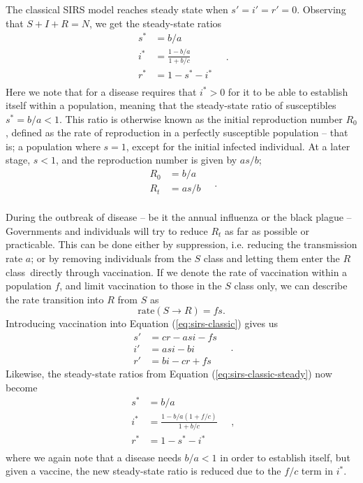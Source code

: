 \documentclass[]{article}
\begin{document}
The classical SIRS model reaches steady state when $s'=i'=r'=0$. Observing that $S + I + R = N$, we get the steady-state ratios
\begin{equation} \label{eq:sirs-classic-steady}
\begin{aligned}
	s^* &= b/a \\
	i^* &= \frac{1 - b/a}{1 + b/c} \\
	r^* &= 1 - s^* - i^* \\
\end{aligned} \quad .
\end{equation}
Here we note that for a disease requires that $i^* > 0$ for it to be able to establish itself within a population, meaning that the steady-state ratio of susceptibles $s^* = b/a < 1$. This ratio is otherwise known as the initial reproduction number $R_0$, defined as the rate of reproduction in a perfectly susceptible population -- that is; a population where $s = 1$, except for the initial infected individual. At a later stage, $s < 1$, and the reproduction number is given by $as/b$;
\begin{equation}
\begin{aligned}
	R_0 &= b/a \\
	R_t &= as/b \\
\end{aligned} \quad .
\end{equation}

During the outbreak of disease -- be it the annual influenza or the black plague -- Governments and individuals will try to reduce $R_t$ as far as possible or practicable. This can be done either by suppression, i.e. reducing the transmission rate $a$; or by removing individuals from the $S$ class and letting them enter the $R$ class directly through vaccination. If we denote the rate of vaccination within a population $f$, and limit vaccination to those in the $S$ class only, we can describe the rate transition into $R$ from $S$ as
\begin{equation}
	\mathrm{rate}(S \rightarrow R) = fs.
\end{equation}
Introducing vaccination into Equation (\ref{eq:sirs-classic}) gives us
\begin{equation} \label{eq:sirs-vaccinated}
\begin{aligned}
	s' &= cr - asi - fs \\
	i' &= asi - bi \\
	r' &= bi - cr + fs
\end{aligned} \quad .
\end{equation}
Likewise, the steady-state ratios from Equation (\ref{eq:sirs-classic-steady}) now become
\begin{equation} \label{eq:sirs-vaccinated-steady}
\begin{aligned}
	s^* &= b/a \\
	i^* &= \frac{1 - b/a(1 + f/c)}{1 + b/c} \\
	r^* &= 1 - s^* - i^* \\
\end{aligned} \quad ,
\end{equation}
where we again note that a disease needs $b/a < 1$ in order to establish itself, but given a vaccine, the new steady-state ratio is reduced due to the $f/c$ term in $i^*$.
\end{document}

